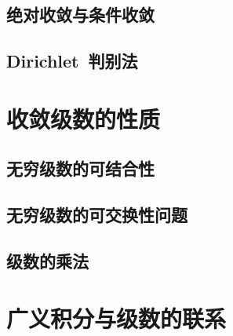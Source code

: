 \subsection{绝对收敛与条件收敛}
\subsection{Dirichlet~判别法}
\begin{exercise}

\end{exercise}
\section{收敛级数的性质}
\subsection{无穷级数的可结合性}
\subsection{无穷级数的可交换性问题}
\subsection{级数的乘法}
\begin{exercise}

\end{exercise}
\section{广义积分与级数的联系}
\begin{exercise*}

\end{exercise*}




\endinput
